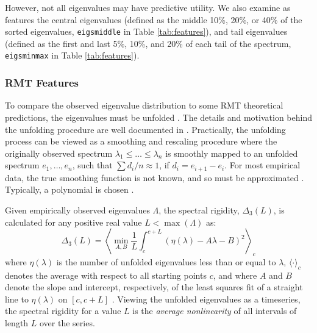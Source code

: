 \documentclass[12pt]{spieman}  %
\newcommand{\code}[1]{\small\texttt{#1}\normalsize}
\begin{document}
\begin{spacing}{2}
However, not all eigenvalues may have predictive utility. We also examine as
features the central eigenvalues (defined as the middle 10\%, 20\%, or 40\% of
the sorted eigenvalues, \code{eigsmiddle} in Table \ref{tab:features}), and
tail eigenvalues (defined as the first and last 5\%,  10\%, and 20\% of each
tail of the spectrum, \code{eigsminmax} in Table \ref{tab:features}).


\subsubsection{RMT Features}
\label{sec:rmt-features}


To compare the observed eigenvalue distribution to some RMT theoretical
predictions, the eigenvalues must be unfolded
\cite{guhrRandommatrixTheoriesQuantum1998a,mehtaRandomMatrices2004}. The
details and motivation behind the unfolding procedure are well documented in
\cite{guhrRandommatrixTheoriesQuantum1998a}. Practically, the unfolding process
can be viewed as a smoothing and rescaling procedure where the originally
observed spectrum \(\lambda_1 \le \dots \le \lambda_n\) is smoothly mapped to
an unfolded spectrum \(e_1, \dots, e_n\), such that \(\sum d_i/n \approx 1\),
if \(d_i = e_{i+1} - e_i \). For most empirical data, the true smoothing
function is not known, and so must be approximated
\cite{guhrRandommatrixTheoriesQuantum1998a,mehtaRandomMatrices2004}. Typically,
a polynomial is chosen \cite{abul-magdUnfoldingSpectrumChaotic2014}.

Given empirically observed eigenvalues \(\Lambda\), the spectral rigidity,
\(\Delta_3(L)\), is calculated for any positive real value \(L <
\max(\Lambda)\) as:
\begin{equation}
\label{eq:rigidity}
\Delta_3(L) = \left \langle \min_{A,B} \frac{1}{L} \int_c^{c+L} \left(  \eta(\lambda) -A \lambda - B \right)^2 \right \rangle_c
\end{equation}
where \(\eta(\lambda)\) is the number of unfolded eigenvalues less than or
equal to \(\lambda\), \(\langle \cdot \rangle_c\) denotes the average with
respect to all starting points \(c\), and where \(A\) and \(B\) denote the
slope and intercept, respectively, of the least squares fit of a straight line
to \(\eta(\lambda)\) on \([c, c+L]\)
\cite{guhrRandommatrixTheoriesQuantum1998a}. Viewing the unfolded eigenvalues
as a timeseries, the spectral rigidity for a value \(L\) is the
\textit{average nonlinearity} of all intervals of length \(L\) over the series.



\end{spacing}
\end{document}
